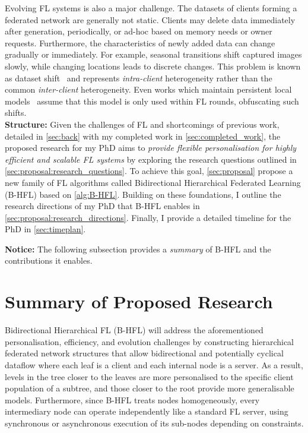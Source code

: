 Evolving FL systems is also a major challenge. The datasets of clients forming a federated network are generally not static. Clients may delete data immediately after generation, periodically, or ad-hoc based on memory needs or owner requests. Furthermore, the characteristics of newly added data can change gradually or immediately. For example, seasonal transitions shift captured images slowly, while changing locations leads to discrete changes. This problem is known as dataset shift~\citep[sec. 3.1]{AdvancedAndOpenProblems} and represents \emph{intra-client} heterogeneity rather than the common \emph{inter-client} heterogeneity. Even works which maintain persistent local models~\citep{Ditto,FlWithPersonalisationLayers,AdaptivePersonalisedFederatedLearning,FederatedLearningMixtureOfGlobalAndLocal} assume that this model is only used within FL rounds, obfuscating such shifts.\\

\noindent \textbf{Structure:} Given the challenges of FL and shortcomings of previous work, detailed in \cref{sec:back} with my completed work in \cref{sec:completed_work}, the proposed research for my PhD aims to \emph{provide flexible personalisation for highly efficient and scalable FL systems} by exploring the research questions outlined in \cref{sec:proposal:research_questions}. To achieve this goal, \cref{sec:proposal} propose a new family of FL algorithms called Bidirectional Hierarchical Federated Learning (B-HFL) based on \cref{alg:B-HFL}. Building on these foundations, I outline the research directions of my PhD that B-HFL enables in \cref{sec:proposal:research_directions}. Finally, I provide a detailed timeline for the PhD in \cref{sec:timeplan}.

\noindent \textbf{Notice:} The following subsection provides a \emph{summary} of B-HFL and the contributions it enables.
\section{Summary of Proposed Research}
Bidirectional Hierarchical FL (B-HFL) will address the aforementioned personalisation, efficiency, and evolution challenges by constructing hierarchical federated network structures that allow bidirectional and potentially cyclical dataflow where each leaf is a client and each internal node is a server. As a result, levels in the tree closer to the leaves are more personalised to the specific client population of a subtree, and those closer to the root provide more generalisable models. Furthermore, since B-HFL treats nodes homogeneously, every intermediary node can operate independently like a standard FL server, using synchronous or asynchronous execution of its sub-nodes depending on constraints.

